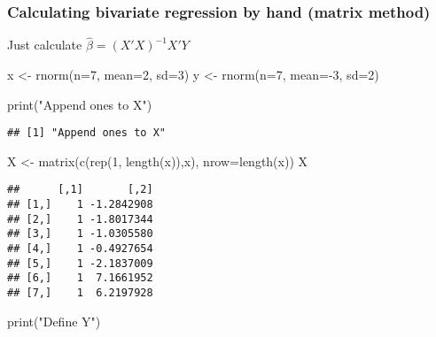 \documentclass[
]{article}
\newenvironment{Shaded}{\begin{snugshade}}{\end{snugshade}}
\newcommand{\AttributeTok}[1]{\textcolor[rgb]{0.77,0.63,0.00}{#1}}
\newcommand{\DecValTok}[1]{\textcolor[rgb]{0.00,0.00,0.81}{#1}}
\newcommand{\FunctionTok}[1]{\textcolor[rgb]{0.00,0.00,0.00}{#1}}
\newcommand{\NormalTok}[1]{#1}
\newcommand{\OtherTok}[1]{\textcolor[rgb]{0.56,0.35,0.01}{#1}}
\newcommand{\SpecialCharTok}[1]{\textcolor[rgb]{0.00,0.00,0.00}{#1}}
\newcommand{\StringTok}[1]{\textcolor[rgb]{0.31,0.60,0.02}{#1}}
\begin{document}
\hypertarget{calculating-bivariate-regression-by-hand-matrix-method}{%
\subsubsection{Calculating bivariate regression by hand (matrix
method)}\label{calculating-bivariate-regression-by-hand-matrix-method}}

Just calculate \(\hat\beta=(X'X)^{-1}X'Y\)

\begin{Shaded}
\begin{Highlighting}[]
\NormalTok{x }\OtherTok{\textless{}{-}} \FunctionTok{rnorm}\NormalTok{(}\AttributeTok{n=}\DecValTok{7}\NormalTok{, }\AttributeTok{mean=}\DecValTok{2}\NormalTok{, }\AttributeTok{sd=}\DecValTok{3}\NormalTok{)}
\NormalTok{y }\OtherTok{\textless{}{-}} \FunctionTok{rnorm}\NormalTok{(}\AttributeTok{n=}\DecValTok{7}\NormalTok{, }\AttributeTok{mean=}\SpecialCharTok{{-}}\DecValTok{3}\NormalTok{, }\AttributeTok{sd=}\DecValTok{2}\NormalTok{)}

\FunctionTok{print}\NormalTok{(}\StringTok{"Append ones to X"}\NormalTok{)}
\end{Highlighting}
\end{Shaded}

\begin{verbatim}
## [1] "Append ones to X"
\end{verbatim}

\begin{Shaded}
\begin{Highlighting}[]
\NormalTok{X }\OtherTok{\textless{}{-}} \FunctionTok{matrix}\NormalTok{(}\FunctionTok{c}\NormalTok{(}\FunctionTok{rep}\NormalTok{(}\DecValTok{1}\NormalTok{, }\FunctionTok{length}\NormalTok{(x)),x), }\AttributeTok{nrow=}\FunctionTok{length}\NormalTok{(x))}
\NormalTok{X}
\end{Highlighting}
\end{Shaded}

\begin{verbatim}
##      [,1]       [,2]
## [1,]    1 -1.2842908
## [2,]    1 -1.8017344
## [3,]    1 -1.0305580
## [4,]    1 -0.4927654
## [5,]    1 -2.1837009
## [6,]    1  7.1661952
## [7,]    1  6.2197928
\end{verbatim}

\begin{Shaded}
\begin{Highlighting}[]
\FunctionTok{print}\NormalTok{(}\StringTok{"Define Y"}\NormalTok{)}
\end{Highlighting}
\end{Shaded}
\end{document}
